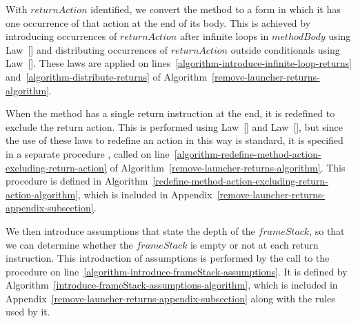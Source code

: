 With $returnAction$ identified, we convert the method to a form in
which it has one occurrence of that action at the end of its body.
This is achieved by introducing occurrences of $returnAction$ after
infinite loops in $methodBody$ using
Law~[] and distributing occurrences of
$returnAction$ outside conditionals using
Law~[].
These laws are applied on
lines~\ref{algorithm-introduce-infinite-loop-returns}
and~\ref{algorithm-distribute-returns} of
Algorithm~\ref{remove-launcher-returns-algorithm}.

When the method has a single return instruction at the end, it is
redefined to exclude the return action.
This is performed using Law~[] and
Law~[], but since the use of these laws to
redefine an action in this way is standard, it is specified in a
separate procedure
,
called on
line~\ref{algorithm-redefine-method-action-excluding-return-action} of
Algorithm~\ref{remove-launcher-returns-algorithm}.
This procedure is defined in
Algorithm~\ref{redefine-method-action-excluding-return-action-algorithm},
which is included in
Appendix~\ref{remove-launcher-returns-appendix-subsection}.

We then introduce assumptions that state the depth of the
$frameStack$, so that we can determine whether the $frameStack$ is
empty or not at each return instruction.
This introduction of assumptions is performed by the call to the
 procedure on
line~\ref{algorithm-introduce-frameStack-assumptions}.
It is defined by
Algorithm~\ref{introduce-frameStack-assumptions-algorithm}, which is
included in Appendix~\ref{remove-launcher-returns-appendix-subsection}
along with the rules used by it.


